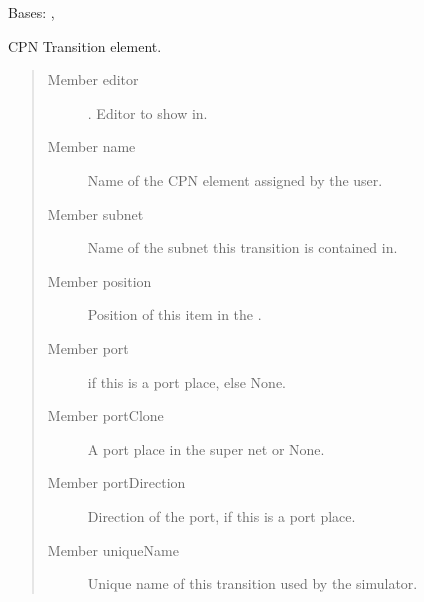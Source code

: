 \documentclass[a4paper,10pt,english]{sphinxmanual}
\begin{document}

\begin{fulllineitems}
\label{model_link:model.AbstractItem.oct_}
\end{fulllineitems}

\label{model_link:module-model.PlaceItem}

\begin{fulllineitems}
\label{model_link:model.PlaceItem.PlaceItem}
Bases: , {\hyperref[model_link:model.AbstractItem.AbstractItem]{}}

CPN Transition element.
\begin{quote}\begin{description}
\item[{Member editor}] \leavevmode
{}. Editor to show in.

\item[{Member name}] \leavevmode
Name of the CPN element assigned by the user.

\item[{Member subnet}] \leavevmode
Name of the subnet this transition is contained in.

\item[{Member position}] \leavevmode
Position of this item in the .

\item[{Member port}] \leavevmode
{} if this is a port place, else None.

\item[{Member portClone}] \leavevmode
A port place in the super net or None.

\item[{Member portDirection}] \leavevmode
Direction of the port, if this is a port place.

\item[{Member uniqueName}] \leavevmode
Unique name of this transition used by the simulator.


\end{description}
\end{quote}
\end{fulllineitems}
\end{document}

